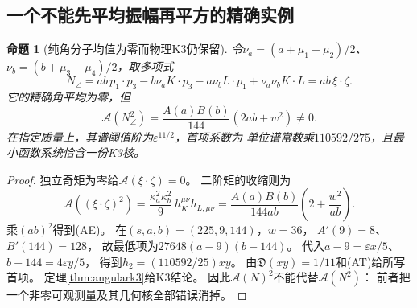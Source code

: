 \documentclass[11pt,a4paper]{ctexart}
\theoremstyle{cnplain}\newtheorem{theorem}{定理}[section]
\newtheorem{proposition}[theorem]{命题}
\theoremstyle{definition}\newtheorem{definition}[theorem]{定义}
\theoremstyle{remark}\newtheorem{remark}[theorem]{注}
\begin{document}
\subsection{一个不能先平均振幅再平方的精确实例}
\begin{proposition}[纯角分子均值为零而物理K3仍保留]\label{prop:angularcounterexample}
令$\nu_a=(a+\mu_1-\mu_2)/2$、$\nu_b=(b+\mu_3-\mu_4)/2$，取多项式
\[
 N_\angle=ab\,p_1\cdot p_3-b\nu_a K\cdot p_3
                 -a\nu_b L\cdot p_1+\nu_a\nu_b K\cdot L
           =ab\,\xi\cdot\zeta.
\]
它的精确角平均为零，但
\[
 \mathcal A(N_\angle^2)
   =\frac{A(a)B(b)}{144}\left(2ab+w^2\right)\ne0.
 \tag{AE}\label{eq:angularexample}
\]
在指定质量上，其谱阈值阶为$\varepsilon^{11/2}$，首项系数为
单位谱常数乘$110592/275$，且最小函数系统恰含一份K3核。
\end{proposition}
\begin{proof}
独立奇矩为零给$\mathcal A(\xi\cdot\zeta)=0$。
二阶矩的收缩则为
\[
 \mathcal A((\xi\cdot\zeta)^2)
 =\frac{\kappa_a^2\kappa_b^2}{9}\,
                   h_K^{\mu\nu}h_{L,\mu\nu}
 =\frac{A(a)B(b)}{144ab}
                   \left(2+\frac{w^2}{ab}\right).
\]
乘$(ab)^2$得到(AE)。
在$(s,a,b)=(225,9,144)$，$w=36$，
$A'(9)=8$、$B'(144)=128$，
故最低项为$27648(a-9)(b-144)$。
代入$a-9=\varepsilon x/5$、$b-144=4\varepsilon y/5$，
得到$h_2=(110592/25)xy$。
由$\mathfrak D(xy)=1/11$和(AT)给所写首项。
定理\ref{thm:angulark3}给K3结论。
因此$\mathcal A(N)^2$不能代替$\mathcal A(N^2)$：
前者把一个非零可观测量及其几何核全部错误消掉。
\end{proof}
\end{document}
